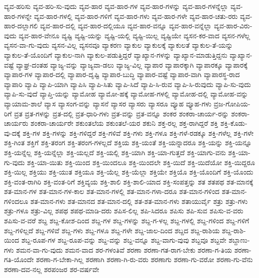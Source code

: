 {ವ್ಯವ-ಹರಿಸು
ವ್ಯವ-ಹರಿ-ಸು-ವುದು
ವ್ಯವ-ಹಾರ
ವ್ಯವ-ಹಾರ-ಗಳ
ವ್ಯವ-ಹಾರ-ಗಳನ್ನು
ವ್ಯವ-ಹಾರ-ಗಳನ್ನೆಲ್ಲಾ
ವ್ಯವ-ಹಾರ-ಗಳನ್ನೇ
ವ್ಯವ-ಹಾರ-ಗಳಲ್ಲಿ
ವ್ಯವ-ಹಾರ-ಗಳಿಗೆ
ವ್ಯವ-ಹಾರ-ಗಳು
ವ್ಯವ-ಹಾರ-ಗಳೇ
ವ್ಯವ-ಹಾರ-ಚತು-ರರು
ವ್ಯವ-ಹಾರ-ದಲ್ಲಾಗಲಿ
ವ್ಯವ-ಹಾರ-ದಲ್ಲಿ
ವ್ಯವ-ಹಾರ-ದಲ್ಲಿಯೂ
ವ್ಯವ-ಹಾರ-ವನ್ನೂ
ವ್ಯವ-ಹಾರ-ವನ್ನೆಲ್ಲಾ
ವ್ಯವ-ಹಾರ-ವಿರು-ವುದು
ವ್ಯವ-ಹಾರ-ವೇನೂ
ವ್ಯಷ್ಟಿ
ವ್ಯಷ್ಟಿ-ಯನ್ನು
ವ್ಯಷ್ಟಿ-ಯಲ್ಲಿ
ವ್ಯಷ್ಟಿ-ಯಿಲ್ಲ
ವ್ಯಷ್ಟಿಯೇ
ವ್ಯಸನ-ಕರ-ವಾದ
ವ್ಯಸನ-ಗಳೆಲ್ಲ
ವ್ಯಸನ-ವಾ-ಗು-ವುದು
ವ್ಯಸನ-ವಿಲ್ಲ
ವ್ಯಸನವೂ
ವ್ಯಾಕರಣ
ವ್ಯಾಕುಲ
ವ್ಯಾಕುಲಕ್ಕೆ
ವ್ಯಾಕುಲತೆ
ವ್ಯಾಕುಲ-ತೆ-ಯನ್ನು
ವ್ಯಾಕುಲ-ತೆ-ಯೊಂದಿಗೆ
ವ್ಯಾಕುಲ-ನಾಗಿ
ವ್ಯಾಕುಲ-ಪಡುತ್ತಿದ್ದರೆ
ವ್ಯಾಖ್ಯಾನ-ಗಳನ್ನು
ವ್ಯಾಖ್ಯಾನ-ಮಾಡುತ್ತಿದ್ದನು
ವ್ಯಾಖ್ಯಾನ-ವಷ್ಟೆ
ವ್ಯಾಘ್ರ-ದಂತಹ
ವ್ಯಾಜ್ಯ-ವನ್ನು
ವ್ಯಾಜ್ಯವಾ-ಡಲು
ವ್ಯಾಜ್ಯ-ವಿಲ್ಲ
ವ್ಯಾಪಾರ
ವ್ಯಾಪಾರಕ್ಕಾಗಿ
ವ್ಯಾಪಾರಕ್ಕೂ
ವ್ಯಾಪಾರಕ್ಕೆ
ವ್ಯಾಪಾರ-ಗಳ
ವ್ಯಾಪಾರ-ದಲ್ಲಿ
ವ್ಯಾಪಾರ-ದೃಷ್ಟಿ
ವ್ಯಾಪಾರ-ಬುದ್ಧಿ
ವ್ಯಾಪಾರ-ವಷ್ಟೆ
ವ್ಯಾಪಾರ-ವಾಗಿ
ವ್ಯಾಪಾರಸ್ಥ-ರಾದ
ವ್ಯಾಪಾರಿ
ವ್ಯಾಪಿ
ವ್ಯಾಪಿ-ಯಾಗಿ
ವ್ಯಾಪಿಸಿ
ವ್ಯಾಪಿ-ಸಿತು
ವ್ಯಾಪಿ-ಸಿದೆ
ವ್ಯಾಪಿ-ಸಿ-ರುವ
ವ್ಯಾಪಿ-ಸಿ-ರುವುದು
ವ್ಯಾಪಿ-ಸು-ವುದು
ವ್ಯಾಪಿ-ಸು-ವುದೆ
ವ್ಯಾಪ್ತಿ-ಯನ್ನು
ವ್ಯಾಮೋಹ
ವ್ಯಾಮೋ-ಹಕ್ಕೆ
ವ್ಯಾಮೋಹ-ಗಳಲ್ಲಿ
ವ್ಯಾಮೋಹ-ದಲ್ಲಿ
ವ್ಯಾಮೋಹ-ವನ್ನು
ವ್ಯಾಯಾಮ-ಶಾಲೆ
ವ್ಯಾಸ
ವ್ಯಾಸಂಗ-ವನ್ನು
ವ್ಯಾಸನೆ
ವ್ಯಾಸರ
ವ್ಯಾಸರು
ವ್ಯಾಸರೂ
ವ್ಯೂಹ
ವ್ಯೂಹ-ಗಳು
ವ್ರಜ-ಗೋಪಿಯ-ರಿಗೆ
ವ್ರತ
ವ್ರತ-ಗಳನ್ನು
ವ್ರತ-ದಲ್ಲಿ
ವ್ರತ-ಧಾರಿ-ಗಳು
ವ್ರತ-ವನ್ನು
ವ್ರತ-ವನ್ನೂ
ಶಂಕರ
ಶಂಕರಾ-ಚಾರ್ಯ-ರನ್ನು
ಶಂಕರಾ-ಚಾರ್ಯರು
ಶಂಕರಾ-ಚಾರ್ಯರೇ
ಶಕುಂತಲೆಯ
ಶಕುಂತಲೆ-ಯರ
ಶಕುನಿ
ಶಕ್ತ-ರಲ್ಲ
ಶಕ್ತ-ರಾಗಿದ್ದರೆ
ಶಕ್ತಿ
ಶಕ್ತಿ-ಕೊಡು-ವು-ದಕ್ಕೆ
ಶಕ್ತಿ-ಗಳ
ಶಕ್ತಿ-ಗಳನ್ನು
ಶಕ್ತಿ-ಗಳಿದ್ದರೆ
ಶಕ್ತಿ-ಗಳಿವೆ
ಶಕ್ತಿ-ಗಳು
ಶಕ್ತಿ-ಗಳೂ
ಶಕ್ತಿ-ಗಳೆ-ರಡಕ್ಕೂ
ಶಕ್ತಿ-ಗಳೆಲ್ಲ
ಶಕ್ತಿ-ಗಳೇ
ಶಕ್ತಿ-ಗಿಂತ
ಶಕ್ತಿಗೆ
ಶಕ್ತಿ-ತರಂಗ
ಶಕ್ತಿ-ತರಂಗ-ಗಳಲ್ಲದೆ
ಶಕ್ತಿಯ
ಶಕ್ತಿ-ಯಂತೆ
ಶಕ್ತಿ-ಯನ್ನಾದರೂ
ಶಕ್ತಿ-ಯನ್ನು
ಶಕ್ತಿ-ಯನ್ನೂ
ಶಕ್ತಿ-ಯನ್ನೆಲ್ಲ
ಶಕ್ತಿ-ಯನ್ನೆಲ್ಲಾ
ಶಕ್ತಿ-ಯಲ್ಲದೆ
ಶಕ್ತಿ-ಯಲ್ಲಿ
ಶಕ್ತಿ-ಯಾಗಿ
ಶಕ್ತಿ-ಯಾ-ಗುತ್ತದೆ
ಶಕ್ತಿ-ಯಾಗು-ವನು
ಶಕ್ತಿ-ಯಾ-ಗು-ವುದು
ಶಕ್ತಿ-ಯಾ-ಯಿತು
ಶಕ್ತಿ-ಯಿಂದ
ಶಕ್ತಿ-ಯಿಂದಲೂ
ಶಕ್ತಿ-ಯಿಂದಲೇ
ಶಕ್ತಿ-ಯಿದೆ
ಶಕ್ತಿ-ಯಿದೆಯೋ
ಶಕ್ತಿ-ಯಿದ್ದರೂ
ಶಕ್ತಿ-ಯಿಲ್ಲ
ಶಕ್ತಿಯು
ಶಕ್ತಿ-ಯುತ
ಶಕ್ತಿಯೂ
ಶಕ್ತಿ-ಯೆಲ್ಲ
ಶಕ್ತಿ-ಯೆಲ್ಲಾ
ಶಕ್ತಿಯೇ
ಶಕ್ತಿಯೊ
ಶಕ್ತಿ-ಯೊಂದಿಗೆ
ಶಕ್ತಿ-ಯೊಂದು
ಶಕ್ತಿ-ವಂತ-ರಾಗಿರಿ
ಶಕ್ತಿ-ವಂತ-ರಿಗೆ
ಶಕ್ತಿವ್ಯಯ
ಶಕ್ತಿ-ಶಾಲಿ
ಶಕ್ತಿ-ಶಾಲಿ-ಯಾದ
ಶಕ್ತಿ-ಸಂಪತ್ತನ್ನು
ಶತ
ಶತಪಥ
ಶತ-ಮಾನಕ್ಕೆ
ಶತ-ಮಾನ-ಗಳ
ಶತ-ಮಾನ-ಗಳ-ಕಾಲ
ಶತ-ಮಾನ-ಗಳಲ್ಲಿ
ಶತ-ಮಾನ-ಗಳಾ-ದರೂ
ಶತ-ಮಾನ-ಗಳಿಂದ
ಶತ-ಮಾನ-ಗಳಿಂದಲೂ
ಶತ-ಮಾನ-ಗಳು
ಶತ-ಮಾನದ
ಶತ-ಮಾನ-ದಲ್ಲಿ
ಶತ-ಶತ-ಮಾನ-ಗಳು
ಶತಾಯುರ್ವೈ
ಶತ್ರು
ಶತ್ರು-ಗಳು
ಶತ್ರು-ಗಳೂ
ಶತ್ರು-ವಿಲ್ಲ
ಶಪಥ
ಶಪಥ-ಮಾಡಿ-ದರು
ಶಪಿಸ-ಲಿಲ್ಲ
ಶಪಿ-ಸಿದರೂ
ಶಪಿಸು
ಶಪಿ-ಸುವ
ಶಪಿಸು-ವ-ವರು
ಶಪಿಸು-ವ-ವರೆ
ಶಬ್ದ
ಶಬ್ದ-ಕೋಶ-ದಿಂದ
ಶಬ್ದ-ಗಳ
ಶಬ್ದ-ಗಳನ್ನು
ಶಬ್ದ-ಗ-ಳಲ್ಲ
ಶಬ್ದ-ಗಳಲ್ಲಿ
ಶಬ್ದ-ಗಳಿಂದ
ಶಬ್ದ-ಗಳಿಗೆ
ಶಬ್ದ-ಗಳಿಲ್ಲದೆ
ಶಬ್ದ-ಗಳಿವೆ
ಶಬ್ದ-ಗಳು
ಶಬ್ದ-ಗಳೂ
ಶಬ್ದ-ಗಳೇ
ಶಬ್ದ-ಜಾಲ-ದಿಂದ
ಶಬ್ದದ
ಶಬ್ದ-ರಾಶಿಯ
ಶಬ್ದ-ರಾಶಿ-ಯಿಂದ
ಶಬ್ದ-ರೂಪ-ಗಳ
ಶಬ್ದ-ರೂಪ-ವನ್ನು
ಶಬ್ದ-ವನ್ನು
ಶಬ್ದ-ವನ್ನೂ
ಶಬ್ದ-ವಾಗು-ವುವು
ಶಬ್ದವೂ
ಶಬ್ದವೇ
ಶಬ್ದಾಣು-ಗಳು
ಶಮನ-ವಾ-ಗು-ವುದು
ಶಮನ-ವಾದ
ಶರ-ಗಳಂತಿವೆ
ಶರಣಾ
ಶರಣಾ-ಗತ-ರಾಗ-ಬೇಕು
ಶರಣಾ-ಗ-ತಿಯ
ಶರಣಾ-ಗತಿ-ಯೊಂದೇ
ಶರಣಾ-ಗ-ಬೇಕಾ-ಗಿಲ್ಲ
ಶರಣಾಗಿ
ಶರಣಾ-ಗಿ-ರು-ವರು
ಶರಣಾಗು
ಶರಣಾ-ಗು-ವರೋ
ಶರಣಾ-ಗು-ವೆನು
ಶರಣಾ-ದವ-ನಲ್ಲ
ಶರಪಂಜರ
ಶರ-ವರ್ಷವೇ
}
